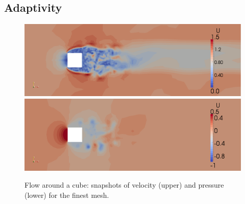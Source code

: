 \subsection{Adaptivity}

\begin{figure}
  \centering
  \includegraphics[width=\largefig]{chapters/hoffman-1/png/fig2b.png}
  \medskip
  \includegraphics[width=\largefig]{chapters/hoffman-1/png/fig2c.png}
  \caption{Flow around a cube: snapshots of velocity (upper) and pressure
    (lower) for the finest mesh.}
  \label{fig:cube2}
\end{figure}

